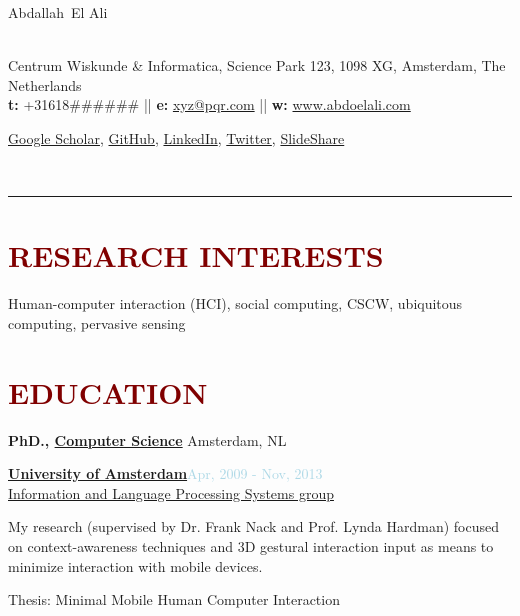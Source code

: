 \documentclass{article}
\newcommand{\makeheading}[1]%
        {\hspace*{-\marginparsep minus \marginparwidth}%
         \begin{minipage}[t]{\textwidth+\marginparwidth+\marginparsep}%
                {\huge #1}\\[-0.0\baselineskip]%
                
         \end{minipage}}
\newcommand{\makeheadingthree}[1]%
        {\hspace*{-\marginparsep minus \marginparwidth}%
         \begin{minipage}[t]{\textwidth+\marginparwidth+\marginparsep}%
                 \rule{\columnwidth}{.6pt}%
         \end{minipage}}
\newenvironment{outerlist}[1][\enskip\textbullet]%
        {\begin{enumerate}[#1]}{\end{enumerate}%
         \vspace{-.6\baselineskip}}
\newenvironment{innerlist}[1][\enskip\textbullet]%
        {\begin{compactenum}[#1]}{\end{compactenum}}
\newcommand\textbox[1]{%
  \parbox{.333\textwidth}{#1}%
}
\begin{document}
\makeheading{Abdallah~El Ali \\ \hfill}


\makeheading{\normalsize Centrum Wiskunde \& Informatica, Science Park 123, 1098 XG, Amsterdam, The Netherlands \\ \hfill \textbf{t:} +31618\#\#\#\#\#\# || \textbf{e:} \href{mailto:xyz@pqr.com}{xyz@pqr.com} || \textbf{w:} \href{http://www.abdoelali.com/}{www.abdoelali.com}} 
\makeheading{\normalsize \href{https://scholar.google.com/citations?user=sC9GVn8AAAAJ&hl=en}{Google Scholar}, \href{https://github.com/abdoelali}{GitHub}, \href{http://www.linkedin.com/in/abdoelali}{LinkedIn}, \href{https://twitter.com/abdoelali}{Twitter}, \href{http://www.slideshare.net/Abd0}{SlideShare} \hfill \textbox \textbox \hfill } 

\makeheadingthree{\large \textcolor{lightblue}{} 
}


\vspace{-1pc}

\section*{\textcolor{maroon}{\normalsize RESEARCH INTERESTS}} 

Human-computer interaction (HCI), social computing, CSCW, ubiquitous computing, pervasive sensing

\section*{\textcolor{maroon}{\normalsize EDUCATION}} 

\textbf{PhD., \href{http://ivi.uva.nl/}{Computer Science}}  \hfill {Amsterdam, NL}
\begin{outerlist}

\item[] \href{http://www.uva.nl/en/home}{\textbf{University of Amsterdam}}\hfill {\textcolor{lightblue}{Apr, 2009 - Nov, 2013}}
 \\ \href{http://ilps.science.uva.nl}{Information and Language Processing Systems group}  
      \medskip

              \begin{innerlist}[-]

       \item My research (supervised by Dr. Frank Nack and Prof. Lynda Hardman) focused on context-awareness techniques and 3D gestural interaction input as means to minimize interaction with mobile devices.

       \item Thesis: Minimal Mobile Human Computer Interaction

	\end{innerlist}

\end{outerlist}
\end{document}

